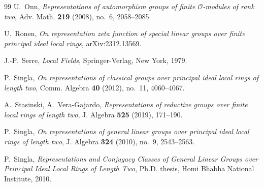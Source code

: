 \documentclass[11pt]{amsart}
\theoremstyle{definition}
\begin{document}
\begin{thebibliography}{99}
		 U.\ Onn, \emph{Representations of automorphism groups of
			finite $\mathcal O$-modules of rank two}, Adv. Math. \textbf{219} (2008),
		no.\ 6, 2058--2085.
		
		 U.\ Ronen, \emph{On representation zeta function of
			special linear groups over finite principal ideal local rings},
		arXiv:2312.13569.
		
		 J.-P.\ Serre, \emph{Local Fields}, Springer-Verlag, New
		York, 1979.
		
		 P.\ Singla, \emph{On representations of
			classical groups over principal ideal local rings of length two}, Comm.
		Algebra \textbf{40} (2012), no.\ 11, 4060--4067.
		
		 A.\ Stasinski, A.\ Vera-Gajardo, \emph{Representations of
			reductive groups over finite local rings of length two}, J. Algebra
		\textbf{525} (2019), 171--190.
		
		 P.\ Singla, \emph{On representations of general
			linear groups over principal ideal local rings of length two}, J. Algebra
		\textbf{324} (2010), no.\ 9, 2543--2563.
		
		 P.\ Singla, \emph{Representations and Conjugacy Classes
			of General Linear Groups over Principal Ideal Local Rings of Length Two},
		Ph.D. thesis, Homi Bhabha National Institute, 2010.
		
	\end{thebibliography}
	
\end{document}
